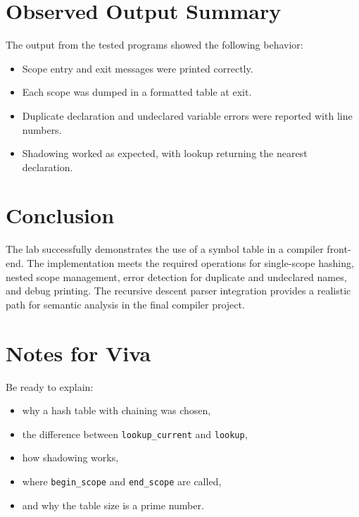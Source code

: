 \documentclass[11pt,a4paper]{article}
\begin{document}
\section*{Observed Output Summary}
The output from the tested programs showed the following behavior:
\begin{itemize}
    \item Scope entry and exit messages were printed correctly.
    \item Each scope was dumped in a formatted table at exit.
    \item Duplicate declaration and undeclared variable errors were reported with line numbers.
    \item Shadowing worked as expected, with lookup returning the nearest declaration.
\end{itemize}

\section*{Conclusion}
The lab successfully demonstrates the use of a symbol table in a compiler front-end. The implementation meets the required operations for single-scope hashing, nested scope management, error detection for duplicate and undeclared names, and debug printing. The recursive descent parser integration provides a realistic path for semantic analysis in the final compiler project.

\section*{Notes for Viva}
Be ready to explain:
\begin{itemize}
    \item why a hash table with chaining was chosen,
    \item the difference between \texttt{lookup\_current} and \texttt{lookup},
    \item how shadowing works,
    \item where \texttt{begin\_scope} and \texttt{end\_scope} are called,
    \item and why the table size is a prime number.
\end{itemize}
\end{document}

